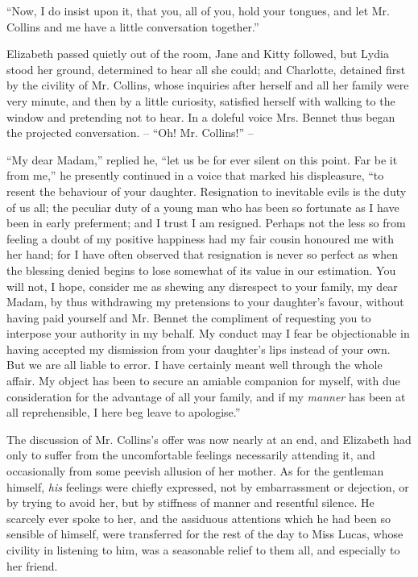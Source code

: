 “Now, I do insist upon it, that you, all of you, hold
your tongues, and let Mr. Collins and me have a little
conversation together.”

Elizabeth passed quietly out of the room, Jane and
Kitty followed, but Lydia stood her ground, determined
to hear all she could; and Charlotte, detained first by
the civility of Mr. Collins, whose inquiries after herself
and all her family were very minute, and then by a little
curiosity, satisfied herself with walking to the window and
pretending not to hear. In a doleful voice Mrs. Bennet
thus began the projected conversation. -- “Oh! Mr.
Collins!” --

“My dear Madam,” replied he, “let us be for ever
silent on this point. Far be it from me,” he presently
continued in a voice that marked his displeasure, “to
resent the behaviour of your daughter. Resignation to
inevitable evils is the duty of us all; the peculiar duty
of a young man who has been so fortunate as I have been
in early preferment; and I trust I am resigned. Perhaps
not the less so from feeling a doubt of my positive happiness
had my fair cousin honoured me with her hand;
for I have often observed that resignation is never so
perfect as when the blessing denied begins to lose somewhat
of its value in our estimation. You will not, I hope,
consider me as shewing any disrespect to your family,
my dear Madam, by thus withdrawing my pretensions to
your daughter’s favour, without having paid yourself and
Mr. Bennet the compliment of requesting you to interpose
your authority in my behalf. My conduct may
I fear be objectionable in having accepted my dismission
from your daughter’s lips instead of your own. But we
are all liable to error. I have certainly meant well through
the whole affair. My object has been to secure an amiable
companion for myself, with due consideration for the
advantage of all your family, and if my \textit{manner} has been
at all reprehensible, I here beg leave to apologise.”


The discussion of Mr. Collins’s offer was now nearly at
an end, and Elizabeth had only to suffer from the uncomfortable
feelings necessarily attending it, and occasionally
from some peevish allusion of her mother. As for the
gentleman himself, \textit{his} feelings were chiefly expressed, not
by embarrassment or dejection, or by trying to avoid her,
but by stiffness of manner and resentful silence. He
scarcely ever spoke to her, and the assiduous attentions
which he had been so sensible of himself, were transferred
for the rest of the day to Miss Lucas, whose civility in
listening to him, was a seasonable relief to them all, and
especially to her friend.

